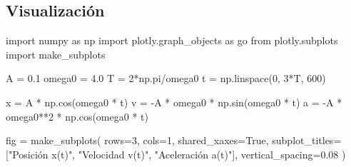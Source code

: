 \documentclass[
  letterpaper,
  DIV=11,
  numbers=noendperiod]{scrreprt}
\newenvironment{Shaded}{\begin{snugshade}}{\end{snugshade}}
\newcommand{\DecValTok}[1]{\textcolor[rgb]{0.68,0.00,0.00}{#1}}
\newcommand{\FloatTok}[1]{\textcolor[rgb]{0.68,0.00,0.00}{#1}}
\newcommand{\ImportTok}[1]{\textcolor[rgb]{0.00,0.46,0.62}{#1}}
\newcommand{\NormalTok}[1]{\textcolor[rgb]{0.00,0.23,0.31}{#1}}
\newcommand{\OperatorTok}[1]{\textcolor[rgb]{0.37,0.37,0.37}{#1}}
\newcommand{\StringTok}[1]{\textcolor[rgb]{0.13,0.47,0.30}{#1}}
\newcommand{\VariableTok}[1]{\textcolor[rgb]{0.07,0.07,0.07}{#1}}
\begin{document}
\subsection{Visualización}\label{visualizaciuxf3n}

\begin{Shaded}
\begin{Highlighting}[]
\ImportTok{import}\NormalTok{ numpy }\ImportTok{as}\NormalTok{ np}
\ImportTok{import}\NormalTok{ plotly.graph\_objects }\ImportTok{as}\NormalTok{ go}
\ImportTok{from}\NormalTok{ plotly.subplots }\ImportTok{import}\NormalTok{ make\_subplots}

\NormalTok{A      }\OperatorTok{=} \FloatTok{0.1}      
\NormalTok{omega0 }\OperatorTok{=} \FloatTok{4.0}      
\NormalTok{T      }\OperatorTok{=} \DecValTok{2}\OperatorTok{*}\NormalTok{np.pi}\OperatorTok{/}\NormalTok{omega0}
\NormalTok{t      }\OperatorTok{=}\NormalTok{ np.linspace(}\DecValTok{0}\NormalTok{, }\DecValTok{3}\OperatorTok{*}\NormalTok{T, }\DecValTok{600}\NormalTok{)}

\NormalTok{x }\OperatorTok{=}\NormalTok{ A }\OperatorTok{*}\NormalTok{ np.cos(omega0 }\OperatorTok{*}\NormalTok{ t)}
\NormalTok{v }\OperatorTok{=} \OperatorTok{{-}}\NormalTok{A }\OperatorTok{*}\NormalTok{ omega0 }\OperatorTok{*}\NormalTok{ np.sin(omega0 }\OperatorTok{*}\NormalTok{ t)}
\NormalTok{a }\OperatorTok{=} \OperatorTok{{-}}\NormalTok{A }\OperatorTok{*}\NormalTok{ omega0}\OperatorTok{**}\DecValTok{2} \OperatorTok{*}\NormalTok{ np.cos(omega0 }\OperatorTok{*}\NormalTok{ t)}

\NormalTok{fig }\OperatorTok{=}\NormalTok{ make\_subplots(}
\NormalTok{    rows}\OperatorTok{=}\DecValTok{3}\NormalTok{, cols}\OperatorTok{=}\DecValTok{1}\NormalTok{, shared\_xaxes}\OperatorTok{=}\VariableTok{True}\NormalTok{,}
\NormalTok{    subplot\_titles}\OperatorTok{=}\NormalTok{[}\StringTok{"Posición x(t)"}\NormalTok{, }\StringTok{"Velocidad v(t)"}\NormalTok{, }\StringTok{"Aceleración a(t)"}\NormalTok{],}
\NormalTok{    vertical\_spacing}\OperatorTok{=}\FloatTok{0.08}
\NormalTok{)}


\end{Highlighting}
\end{Shaded}
\end{document}

